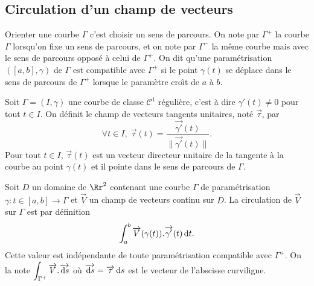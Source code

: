 \documentclass[class=report,crop=false]{standalone}
\begin{document}
\vskip8mm

\subsection{Circulation d'un champ de vecteurs}

\vskip4mm

\begin{definition}Orienter une courbe $\Gamma $ c'est choisir un sens de parcours. On note par $\Gamma ^{+}$ la courbe $\Gamma$ lorsqu'on fixe un sens de parcours, et on note par $\Gamma ^{-}$ la m\^eme courbe mais avec le sens de parcours opposé à celui de $\Gamma ^+$. On dit qu'une paramétrisation $([a,b],\gamma )$ de $\Gamma$ est compatible avec $\Gamma ^+$ si le point $\gamma (t)$ se déplace dans le sens de parcours de $\Gamma ^+$ lorsque le paramètre cro\^{\i}t de $a$ à $b$.
\end{definition}

\vskip4mm

\noindent Soit $\Gamma =\left(I,\gamma\right)$ une courbe de classe ${\mathscr C}^1$ régulière, c'est à dire $\gamma '(t)\neq 0$ pour tout $t\in I$. On définit le champ de vecteurs tangents unitaires, noté $\overrightarrow{\tau }$, par
$$\forall t\in I,\; \overrightarrow{\tau }(t)=\frac{\overrightarrow{\gamma '}(t)}{\|\overrightarrow{\gamma '}(t)\|}.$$
Pour tout $t\in I$, $\overrightarrow{\tau }(t)$ est un vecteur directeur unitaire de la tangente à la courbe au point $\gamma (t)$ et il pointe dans le sens de parcours de $\Gamma$.

\vskip6mm

\begin{definition}[\bf Proposition]Soit $D$ un domaine de $\Rr^2$ contenant une courbe $\Gamma$ de paramétrisation $\gamma :t\in [a,b]\to \Gamma$ et $\overrightarrow{V}$ un champ de vecteurs continu sur $D$. La circulation de $\overrightarrow{V}$ sur $\Gamma$ est par définition
$$\int _a^b\overrightarrow{V}(\gamma (t)).\overrightarrow{\gamma '}(t)\,\mathrm{d} t.$$
Cette valeur est indépendante de toute paramétrisation compatible avec $\Gamma ^+$. On la note $\displaystyle \int _{\Gamma ^+}\overrightarrow{V}.\overrightarrow{\,\mathrm{d} s}$ o\`u $\overrightarrow{\,\mathrm{d} s}=\overrightarrow{\tau }\,\mathrm{d} s$ est le vecteur de l'abscisse curviligne.
\end{definition}

\vskip4mm
\end{document}
